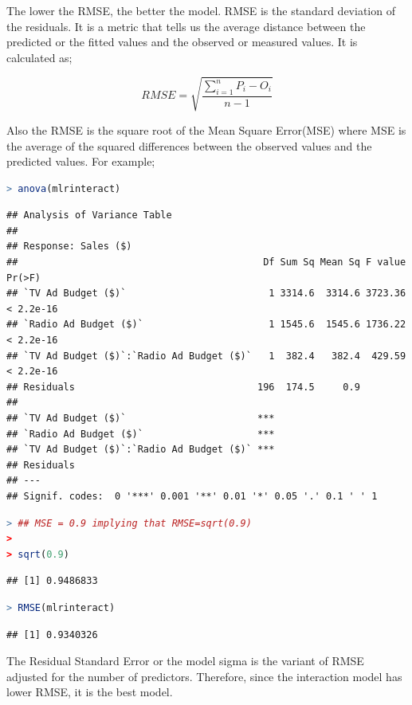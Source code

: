 \documentclass[
]{article}
\begin{document}
The lower the RMSE, the better the model. RMSE is the standard deviation
of the residuals. It is a metric that tells us the average distance
between the predicted or the fitted values and the observed or measured
values. It is calculated as;

\[RMSE=\sqrt{\frac{\sum_{i=1}^n P_i-O_i}{n-1}} \]

Also the RMSE is the square root of the Mean Square Error(MSE) where MSE
is the average of the squared differences between the observed values
and the predicted values. For example;

\begin{lstlisting}[language=R]
> anova(mlrinteract)
\end{lstlisting}

\begin{lstlisting}
## Analysis of Variance Table
## 
## Response: Sales ($)
##                                           Df Sum Sq Mean Sq F value    Pr(>F)
## `TV Ad Budget ($)`                         1 3314.6  3314.6 3723.36 < 2.2e-16
## `Radio Ad Budget ($)`                      1 1545.6  1545.6 1736.22 < 2.2e-16
## `TV Ad Budget ($)`:`Radio Ad Budget ($)`   1  382.4   382.4  429.59 < 2.2e-16
## Residuals                                196  174.5     0.9                  
##                                             
## `TV Ad Budget ($)`                       ***
## `Radio Ad Budget ($)`                    ***
## `TV Ad Budget ($)`:`Radio Ad Budget ($)` ***
## Residuals                                   
## ---
## Signif. codes:  0 '***' 0.001 '**' 0.01 '*' 0.05 '.' 0.1 ' ' 1
\end{lstlisting}

\begin{lstlisting}[language=R]
> ## MSE = 0.9 implying that RMSE=sqrt(0.9)
> 
> sqrt(0.9)
\end{lstlisting}

\begin{lstlisting}
## [1] 0.9486833
\end{lstlisting}

\begin{lstlisting}[language=R]
> RMSE(mlrinteract)
\end{lstlisting}

\begin{lstlisting}
## [1] 0.9340326
\end{lstlisting}

The Residual Standard Error or the model sigma is the variant of RMSE
adjusted for the number of predictors. Therefore, since the interaction
model has lower RMSE, it is the best model.
\end{document}
